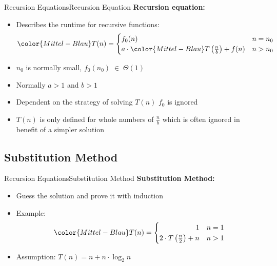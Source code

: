 \begin{frame}{Recursion Equations}{Recursion Equation}
  \textbf{Recursion equation:}
  \begin{itemize}
    \item
    Describes the runtime for recursive functions:
    \begin{displaymath}
    {\color{Mittel-Blau}T(n)} = \begin{cases}
      f_0(n) & n = n_0\\
      a \cdot {\color{Mittel-Blau}T\left(\frac{n}{b}\right)} + f(n) & n > n_0
    \end{cases}
    \end{displaymath}
    \item
      $n_0$ is normally small, $f_0(n_0) \; \in \; \Theta(1)$
    \item
      Normally $a > 1$ and $b > 1$
    \item
      Dependent on the strategy of solving {\color{Mittel-Blau}$T(n)$}
      $f_0$ is ignored
    \item
      {\color{Mittel-Blau}$T(n)$} is only defined for whole numbers of
      {\color{Mittel-Blau}$\frac{n}{b}$} which is often ignored in benefit of
      a simpler solution
  \end{itemize}
\end{frame}


\subsection{Substitution Method}

\begin{frame}{Recursion Equations}{Substitution Method}
  \textbf{Substitution Method:}
  \begin{itemize}
    \item
      Guess the solution and prove it with induction
    \item
      Example:
      \begin{displaymath}
        \color{Mittel-Blau}
        T(n) = \begin{cases}
          \hfill 1 & n = 1\\
          2 \cdot T\left(\frac{n}{2}\right) + n & n > 1
        \end{cases}
      \end{displaymath}
    \item
      Assumption:  {\color{Mittel-Blau}$T(n) = n + n \cdot \log_2 n$}
  \end{itemize}
\end{frame}

